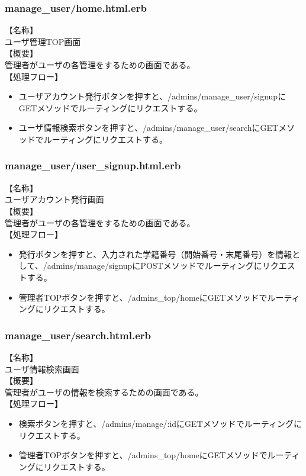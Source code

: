 \documentclass[a4j]{jarticle}
\begin{document}
\subsubsection{manage\_user/home.html.erb}
\noindent
【名称】\\
ユーザ管理TOP画面\\
【概要】\\
管理者がユーザの各管理をするための画面である。\\
【処理フロー】
\begin{itemize}
  \item ユーザアカウント発行ボタンを押すと、/admins/manage\_user/signupにGETメソッドでルーティングにリクエストする。
  \item ユーザ情報検索ボタンを押すと、/admins/manage\_user/searchにGETメソッドでルーティングにリクエストする。
\end{itemize}

\subsubsection{manage\_user/user\_signup.html.erb}
\noindent
【名称】\\
ユーザアカウント発行画面\\
【概要】\\
管理者がユーザの各管理をするための画面である。\\
【処理フロー】
\begin{itemize}
  \item 発行ボタンを押すと、入力された学籍番号（開始番号・末尾番号）を情報として、/admins/manage/signupにPOSTメソッドでルーティングにリクエストする。
  \item 管理者TOPボタンを押すと、/admins\_top/homeにGETメソッドでルーティングにリクエストする。
\end{itemize}

\subsubsection{manage\_user/search.html.erb}
\noindent
【名称】\\
ユーザ情報検索画面\\
【概要】\\
管理者がユーザの情報を検索するための画面である。\\
【処理フロー】
\begin{itemize}
  \item 検索ボタンを押すと、/admins/manage/:idにGETメソッドでルーティングにリクエストする。
  \item 管理者TOPボタンを押すと、/admins\_top/homeにGETメソッドでルーティングにリクエストする。
\end{itemize}
\end{document}
